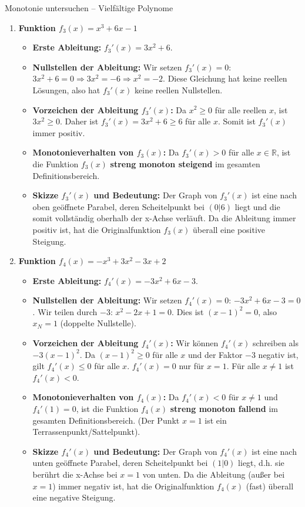 \begin{loesungsumgebung}{Monotonie untersuchen – Vielfältige Polynome}
\begin{enumerate}[label=(\alph*)]
    \item \textbf{Funktion $f_3(x) = x^3 + 6x - 1$}
    \begin{itemize}
        \item \textbf{Erste Ableitung:} $f_3'(x) = 3x^2 + 6$.
        \item \textbf{Nullstellen der Ableitung:} Wir setzen $f_3'(x)=0$:
        $3x^2 + 6 = 0 \Rightarrow 3x^2 = -6 \Rightarrow x^2 = -2$.
        Diese Gleichung hat keine reellen Lösungen, also hat $f_3'(x)$ keine reellen Nullstellen.
        \item \textbf{Vorzeichen der Ableitung $f_3'(x)$:}
        Da $x^2 \ge 0$ für alle reellen $x$, ist $3x^2 \ge 0$. Daher ist $f_3'(x) = 3x^2 + 6 \ge 6$ für alle $x$.
        Somit ist $f_3'(x)$ immer positiv.
        \item \textbf{Monotonieverhalten von $f_3(x)$:}
        Da $f_3'(x) > 0$ für alle $x \in \mathbb{R}$, ist die Funktion $f_3(x)$ \textbf{streng monoton steigend} im gesamten Definitionsbereich.
        \item \textbf{Skizze $f_3'(x)$ und Bedeutung:} Der Graph von $f_3'(x)$ ist eine nach oben geöffnete Parabel, deren Scheitelpunkt bei $(0|6)$ liegt und die somit vollständig oberhalb der x-Achse verläuft. Da die Ableitung immer positiv ist, hat die Originalfunktion $f_3(x)$ überall eine positive Steigung.
    \end{itemize}

    \item \textbf{Funktion $f_4(x) = -x^3 + 3x^2 - 3x + 2$}
    \begin{itemize}
        \item \textbf{Erste Ableitung:} $f_4'(x) = -3x^2 + 6x - 3$.
        \item \textbf{Nullstellen der Ableitung:} Wir setzen $f_4'(x)=0$:
        $-3x^2 + 6x - 3 = 0$. Wir teilen durch $-3$: $x^2 - 2x + 1 = 0$.
        Dies ist $(x-1)^2 = 0$, also $x_N = 1$ (doppelte Nullstelle).
        \item \textbf{Vorzeichen der Ableitung $f_4'(x)$:}
        Wir können $f_4'(x)$ schreiben als $-3(x-1)^2$.
        Da $(x-1)^2 \ge 0$ für alle $x$ und der Faktor $-3$ negativ ist, gilt $f_4'(x) \le 0$ für alle $x$.
        $f_4'(x) = 0$ nur für $x=1$. Für alle $x \neq 1$ ist $f_4'(x) < 0$.
        \item \textbf{Monotonieverhalten von $f_4(x)$:}
        Da $f_4'(x) < 0$ für $x \neq 1$ und $f_4'(1)=0$, ist die Funktion $f_4(x)$ \textbf{streng monoton fallend} im gesamten Definitionsbereich. (Der Punkt $x=1$ ist ein Terrassenpunkt/Sattelpunkt).
        \item \textbf{Skizze $f_4'(x)$ und Bedeutung:} Der Graph von $f_4'(x)$ ist eine nach unten geöffnete Parabel, deren Scheitelpunkt bei $(1|0)$ liegt, d.h. sie berührt die x-Achse bei $x=1$ von unten. Da die Ableitung (außer bei $x=1$) immer negativ ist, hat die Originalfunktion $f_4(x)$ (fast) überall eine negative Steigung.
    \end{itemize}


\end{enumerate}
\end{loesungsumgebung}
